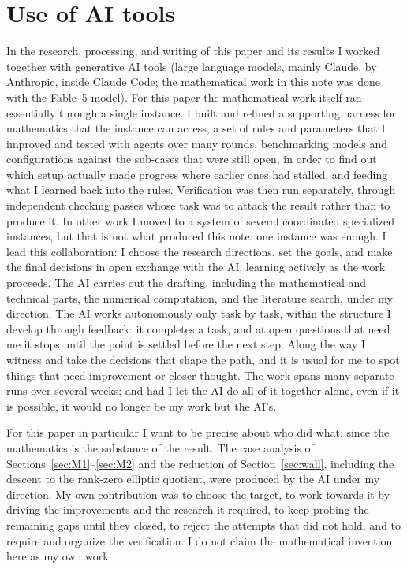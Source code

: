 \documentclass[11pt]{article}
\theoremstyle{remark}
\begin{document}
\section*{Use of AI tools}

In the research, processing, and writing of this paper and its results I worked together with generative AI tools (large language models, mainly Claude, by Anthropic, inside Claude Code; the mathematical work in this note was done with the Fable~5 model). For this paper the mathematical work itself ran essentially through a single instance. I built and refined a supporting harness for mathematics that the instance can access, a set of rules and parameters that I improved and tested with agents over many rounds, benchmarking models and configurations against the sub-cases that were still open, in order to find out which setup actually made progress where earlier ones had stalled, and feeding what I learned back into the rules. Verification was then run separately, through independent checking passes whose task was to attack the result rather than to produce it. In other work I moved to a system of several coordinated specialized instances, but that is not what produced this note: one instance was enough. I lead this collaboration: I choose the research directions, set the goals, and make the final decisions in open exchange with the AI, learning actively as the work proceeds. The AI carries out the drafting, including the mathematical and technical parts, the numerical computation, and the literature search, under my direction. The AI works autonomously only task by task, within the structure I develop through feedback: it completes a task, and at open questions that need me it stops until the point is settled before the next step. Along the way I witness and take the decisions that shape the path, and it is usual for me to spot things that need improvement or closer thought. The work spans many separate runs over several weeks; and had I let the AI do all of it together alone, even if it is possible, it would no longer be my work but the AI's.

For this paper in particular I want to be precise about who did what, since the mathematics is the substance of the result. The case analysis of Sections~\ref{sec:M1}--\ref{sec:M2} and the reduction of Section~\ref{sec:wall}, including the descent to the rank-zero elliptic quotient, were produced by the AI under my direction. My own contribution was to choose the target, to work towards it by driving the improvements and the research it required, to keep probing the remaining gaps until they closed, to reject the attempts that did not hold, and to require and organize the verification. I do not claim the mathematical invention here as my own work.
\end{document}
